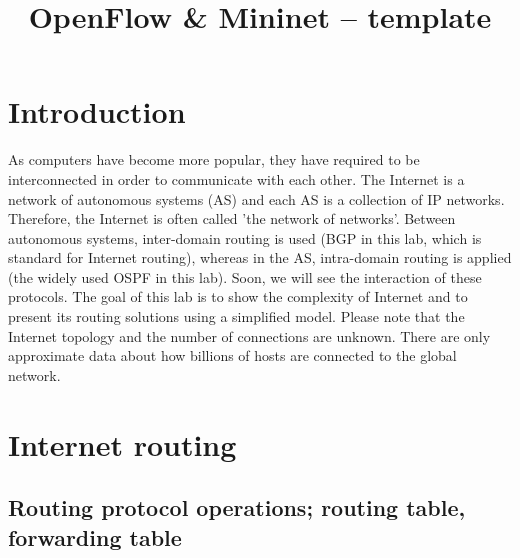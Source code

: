 \documentclass[a4paper]{article}
\title{OpenFlow \& Mininet – template}
\author{}
\date{}
\begin{document}
\maketitle

\tableofcontents

\section{Introduction}
As computers have become more popular, they have required to be interconnected in order to communicate with each other.
The Internet is a network of autonomous systems (AS) and each AS is a collection of IP networks. Therefore, the
Internet is often called 'the network of networks'. Between autonomous systems, inter-domain routing is used (BGP in
this lab, which is standard for Internet routing), whereas in the AS, intra-domain routing is applied (the widely used
OSPF in this lab). Soon, we will see the interaction of these protocols. The goal of this lab is to show the complexity
of Internet and to present its routing solutions using a simplified model. Please note that the Internet topology and
the number of connections are unknown. There are only approximate data about how billions of hosts are connected to the
global network.

\section{Internet routing}

\subsection{Routing protocol operations; routing table, forwarding table}
\end{document}
